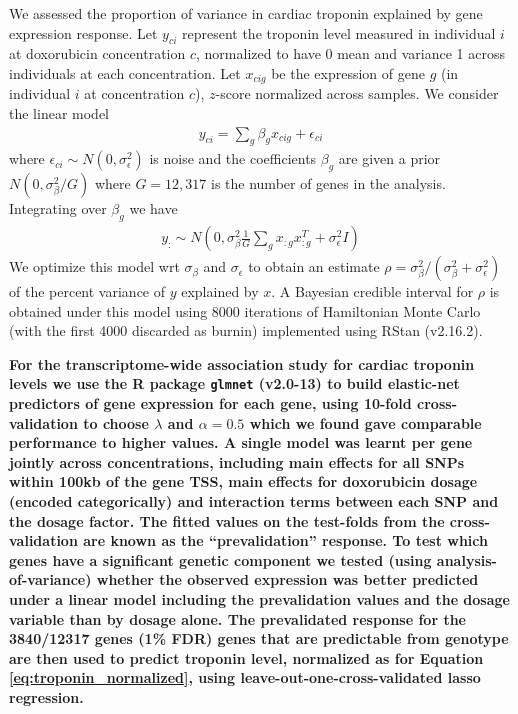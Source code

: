 \documentclass[9pt,lineno]{elife}
\newcommand{\tempbold}[1]{\textbf{#1}}
\begin{document}
We assessed the proportion of variance in cardiac troponin explained by gene expression response. Let $y_{ci}$ represent the troponin level measured in individual $i$ at doxorubicin concentration $c$, normalized to have 0 mean and variance 1 across individuals at each concentration. Let $x_{cig}$ be the expression of gene $g$ (in individual $i$ at concentration $c$), $z$-score normalized across samples. We consider the linear model 
\begin{align}
y_{ci} = \sum_g \beta_g x_{cig} + \epsilon_{ci} \label{eq:troponin_normalized}
\end{align}
where $\epsilon_{ci} \sim N(0,\sigma_\epsilon^2)$ is noise and the coefficients $\beta_g$ are given a prior $N(0, \sigma_\beta^2 / G )$ where $G=12,317$ is the number of genes in the analysis. Integrating over $\beta_g$ we have 
\begin{align}
y_{:} \sim N\left(0 , \sigma_\beta^2 \frac{1}{G} \sum_g x_{:g} x_{:g}^T + \sigma_\epsilon^2 I \right)
\end{align}
We optimize this model wrt $\sigma_\beta$ and $\sigma_\epsilon$ to obtain an estimate $\rho = \sigma_\beta^2 / (\sigma_\beta^2 + \sigma_\epsilon^2)$ of the percent variance of $y$ explained by $x$. A Bayesian credible interval for $\rho$ is obtained under this model using 8000 iterations of Hamiltonian Monte Carlo (with the first 4000 discarded as burnin) implemented using RStan \citep{carpenter2016stan} (v2.16.2). 

\tempbold{For the transcriptome-wide association study for cardiac troponin levels we use the R package \texttt{glmnet} (v2.0-13) to build elastic-net predictors of gene expression for each gene, using 10-fold cross-validation to choose $\lambda$ and $\alpha=0.5$ which we found gave comparable performance to higher values. A single model was learnt per gene jointly across concentrations, including main effects for all SNPs within 100kb of the gene TSS, main effects for doxorubicin dosage (encoded categorically) and interaction terms between each SNP and the dosage factor. The fitted values on the test-folds from the cross-validation are known as the ``prevalidation'' response. To test which genes have a significant genetic component we tested (using analysis-of-variance) whether the observed expression was better predicted under a linear model including the prevalidation values and the dosage variable than by dosage alone. The prevalidated response for the 3840/12317 genes (1\% FDR) genes that are predictable from genotype are then used to predict troponin level, normalized as for Equation \ref{eq:troponin_normalized}, using leave-out-one-cross-validated lasso regression.} 
\end{document}
